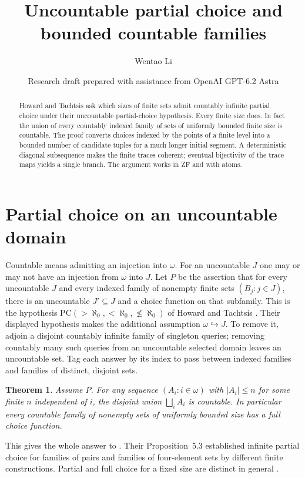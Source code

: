 \documentclass[11pt]{article}
\title{Uncountable partial choice and bounded countable families}
\author{Wentao Li}
\date{Research draft prepared with assistance from OpenAI GPT-6.2 Astra}
\newtheorem{theorem}{Theorem}
\begin{document}
\maketitle
\begin{abstract}
Howard and Tachtsis ask which sizes of finite sets admit countably infinite partial choice under their uncountable partial-choice hypothesis. Every finite size does. In fact the union of every countably indexed family of sets of uniformly bounded finite size is countable. The proof converts choices indexed by the points of a finite level into a bounded number of candidate tuples for a much longer initial segment. A deterministic diagonal subsequence makes the finite traces coherent; eventual bijectivity of the trace maps yields a single branch. The argument works in ZF and with atoms.
\end{abstract}

\section{Partial choice on an uncountable domain}
Countable means admitting an injection into $\omega$. For an uncountable $J$ one may or may not have an injection from $\omega$ into $J$.
Let $P$ be the assertion that for every uncountable $J$ and every indexed family of nonempty finite sets $(B_j:j\in J)$, there is an uncountable $J'\subseteq J$ and a choice function on that subfamily. This is the hypothesis $\mathrm{PC}(>\aleph_0,<\aleph_0,\not\le\aleph_0)$ of Howard and Tachtsis \cite[Proposition~5.1(2)]{ht}. Their displayed hypothesis makes the additional assumption $\omega\hookrightarrow J$. To remove it, adjoin a disjoint countably infinite family of singleton queries; removing countably many such queries from an uncountable selected domain leaves an uncountable set. Tag each answer by its index to pass between indexed families and families of distinct, disjoint sets.
\begin{theorem}\label{main}
Assume $P$. For any sequence $(A_i:i\in\omega)$ with $|A_i|\le n$ for some finite $n$ independent of $i$, the disjoint union $\bigsqcup_i A_i$ is countable. In particular every countable family of nonempty sets of uniformly bounded size has a full choice function.
\end{theorem}
This gives the whole answer to \cite[Section~8, Question~2]{ht}. Their Proposition~5.3 established infinite partial choice for families of pairs and families of four-element sets by different finite constructions. Partial and full choice for a fixed size are distinct in general \cite{hs}.
\end{document}
